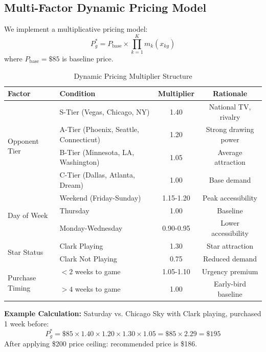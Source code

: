\documentclass{mcmthesis}
\begin{document}
\subsection{Multi-Factor Dynamic Pricing Model}

We implement a multiplicative pricing model:
\begin{equation}
P^*_g = P_{\text{base}} \times \prod_{k=1}^{K} m_k(x_{kg})
\end{equation}
where $P_{\text{base}} = \$85$ is baseline price.

\begin{table}[H]
\centering
\caption{Dynamic Pricing Multiplier Structure}
\begin{tabular}{p{2.2cm}p{4cm}cc}
\toprule
\textbf{Factor} & \textbf{Condition} & \textbf{Multiplier} & \textbf{Rationale} \\
\midrule
\multirow{4}{*}{Opponent Tier} & S-Tier (Vegas, Chicago, NY) & 1.40 & National TV, rivalry \\
& A-Tier (Phoenix, Seattle, Connecticut) & 1.20 & Strong drawing power \\
& B-Tier (Minnesota, LA, Washington) & 1.05 & Average attraction \\
& C-Tier (Dallas, Atlanta, Dream) & 1.00 & Base demand \\
\midrule
\multirow{3}{*}{Day of Week} & Weekend (Friday-Sunday) & 1.15-1.20 & Peak accessibility \\
& Thursday & 1.00 & Baseline \\
& Monday-Wednesday & 0.90-0.95 & Lower accessibility \\
\midrule
\multirow{2}{*}{Star Status} & Clark Playing & 1.30 & Star attraction \\
& Clark Not Playing & 0.75 & Reduced demand \\
\midrule
\multirow{2}{*}{Purchase Timing} & $<2$ weeks to game & 1.05-1.10 & Urgency premium \\
& $>4$ weeks to game & 1.00 & Early-bird baseline \\
\bottomrule
\end{tabular}
\end{table}

\textbf{Example Calculation:} Saturday vs. Chicago Sky with Clark playing, purchased 1 week before:
\begin{equation}
P^*_g = \$85 \times 1.40 \times 1.20 \times 1.30 \times 1.05 = \$85 \times 2.29 = \$195
\end{equation}
After applying \$200 price ceiling: recommended price is \$186.
\end{document}
